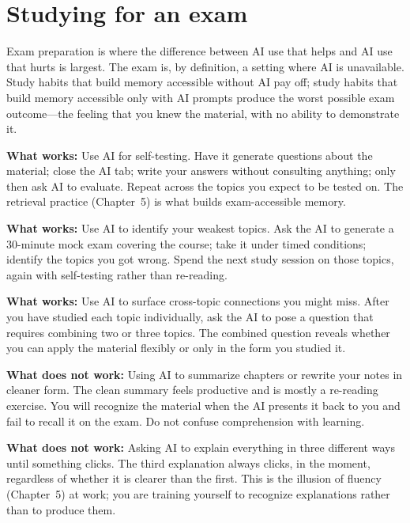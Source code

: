 \documentclass[11pt]{book}
\begin{document}
\section{Studying for an exam}

Exam preparation is where the difference between AI use that helps and AI use that hurts is largest. The exam is, by definition, a setting where AI is unavailable. Study habits that build memory accessible without AI pay off; study habits that build memory accessible only with AI prompts produce the worst possible exam outcome---the feeling that you knew the material, with no ability to demonstrate it.

\textbf{What works:} Use AI for self-testing. Have it generate questions about the material; close the AI tab; write your answers without consulting anything; only then ask AI to evaluate. Repeat across the topics you expect to be tested on. The retrieval practice (Chapter~5) is what builds exam-accessible memory.

\textbf{What works:} Use AI to identify your weakest topics. Ask the AI to generate a 30-minute mock exam covering the course; take it under timed conditions; identify the topics you got wrong. Spend the next study session on those topics, again with self-testing rather than re-reading.

\textbf{What works:} Use AI to surface cross-topic connections you might miss. After you have studied each topic individually, ask the AI to pose a question that requires combining two or three topics. The combined question reveals whether you can apply the material flexibly or only in the form you studied it.

\textbf{What does not work:} Using AI to summarize chapters or rewrite your notes in cleaner form. The clean summary feels productive and is mostly a re-reading exercise. You will recognize the material when the AI presents it back to you and fail to recall it on the exam. Do not confuse comprehension with learning.

\textbf{What does not work:} Asking AI to explain everything in three different ways until something clicks. The third explanation always clicks, in the moment, regardless of whether it is clearer than the first. This is the illusion of fluency (Chapter~5) at work; you are training yourself to recognize explanations rather than to produce them.
\end{document}
